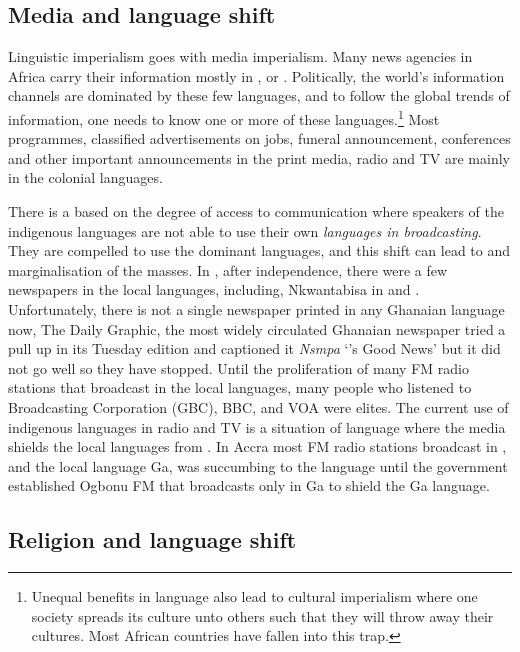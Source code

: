 \documentclass[output=paper,
modfonts
]{langscibook}
\begin{document}
\subsection{Media and language shift}

Linguistic imperialism goes with media imperialism. Many news agencies in Africa carry their information mostly in ,  or . Politically, the world's information channels are dominated by these few languages, and to follow the global trends of information, one needs to know one or more of these languages.\footnote{Unequal benefits in language also lead to cultural imperialism where one society spreads its culture unto others such that they will throw away their cultures. Most African countries have fallen into this trap.}{ }Most programmes, classified advertisements on jobs, funeral announcement, conferences and other important announcements in the print media, radio and TV are mainly in the colonial languages. 

There is a  based on the degree of access to communication where speakers of the indigenous languages are not able to use their own \textit{languages in broadcasting}. They are compelled to use the dominant languages, and this shift can lead to  and marginalisation of the masses. In , after independence, there were a few newspapers in the local languages, including, Nkwantabisa in   and . Unfortunately, there is not a single newspaper printed in any Ghanaian language now, The Daily Graphic, the most widely circulated Ghanaian newspaper tried a pull up in its Tuesday edition and captioned it \textit{ }\textit{Nsmpa} ‘’s Good News’ but it did not go well so they have stopped. Until the proliferation of many FM radio stations that broadcast in the local languages, many people who listened to  Broadcasting Corporation (GBC), BBC, and VOA were elites. The current use of indigenous languages in radio and TV is a situation of language  where the media shields the local languages from . In Accra most FM radio stations broadcast in , and the local language Ga, was succumbing to the  language until the government established Ogbonu FM that broadcasts only in Ga to shield the Ga language. 

\subsection{Religion and language shift}
\end{document}
